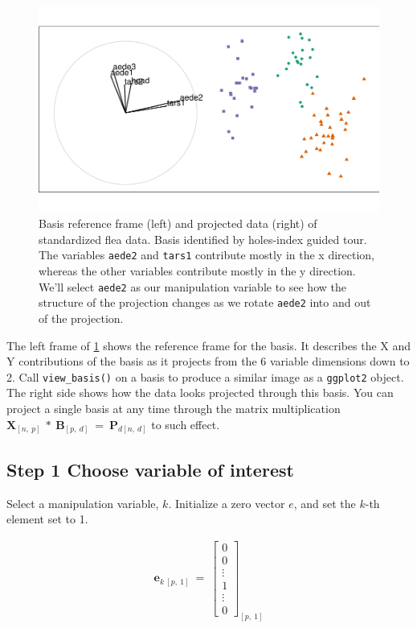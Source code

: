 \documentclass{monashthesis}
\begin{document}
\begin{figure}
\centering
\includegraphics{thesis_files/figure-latex/step0-1.pdf}
\caption{\label{fig:step0}Basis reference frame (left) and projected data (right) of standardized flea data. Basis identified by holes-index guided tour. The variables \texttt{aede2} and \texttt{tars1} contribute mostly in the x direction, whereas the other variables contribute mostly in the y direction. We'll select \texttt{aede2} as our manipulation variable to see how the structure of the projection changes as we rotate \texttt{aede2} into and out of the projection.}
\end{figure}

The left frame of \ref{fig:step0} shows the reference frame for the basis. It describes the X and Y contributions of the basis as it projects from the 6 variable dimensions down to 2. Call \texttt{view\_basis()} on a basis to produce a similar image as a \texttt{ggplot2} object. The right side shows how the data looks projected through this basis. You can project a single basis at any time through the matrix multiplication \(\textbf{X}_{[n,~p]} ~*~ \textbf{B}_{[p,~d]} ~=~ \textbf{P}_{d[n,~d]}\) to such effect.

\hypertarget{step-1-choose-variable-of-interest}{%
\subsection{Step 1 Choose variable of interest}\label{step-1-choose-variable-of-interest}}

Select a manipulation variable, \(k\). Initialize a zero vector \(e\), and set the \(k\)-th element set to 1.

\begin{align*}
\textbf{e}_{k~[p,~1]} ~=~ 
  \begin{bmatrix}
    0 \\
    0 \\
    \vdots \\
    1 \\
    \vdots \\
    0
  \end{bmatrix}_{[p,~1]}
\end{align*}
\end{document}
